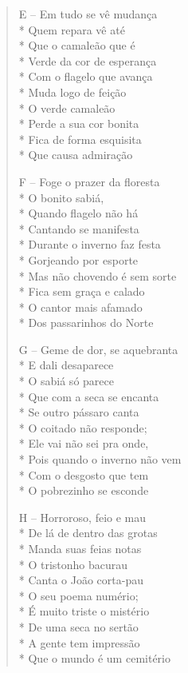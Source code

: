 \begin{verse}
E -- Em tudo se vê mudança\\*
Quem repara vê até\\*
Que o camaleão que é\\*
Verde da cor de esperança\\*
Com o flagelo que avança\\*
Muda logo de feição\\*
O verde camaleão\\*
Perde a sua cor bonita\\*
Fica de forma esquisita\\*
Que causa admiração

F -- Foge o prazer da floresta\\*
O bonito sabiá,\\*
Quando flagelo não há\\*
Cantando se manifesta\\*
Durante o inverno faz festa\\*
Gorjeando por esporte\\*
Mas não chovendo é sem sorte\\*
Fica sem graça e calado\\*
O cantor mais afamado\\*
Dos passarinhos do Norte

G -- Geme de dor, se aquebranta\\*
E dali desaparece\\*
O sabiá só parece\\*
Que com a seca se encanta\\*
Se outro pássaro canta\\*
O coitado não responde;\\*
Ele vai não sei pra onde,\\*
Pois quando o inverno não vem\\*
Com o desgosto que tem\\*
O pobrezinho se esconde

H -- Horroroso, feio e mau\\*
De lá de dentro das grotas\\*
Manda suas feias notas\\*
O tristonho bacurau\\*
Canta o João corta-pau\\*
O seu poema numério;\\*
É muito triste o mistério\\*
De uma seca no sertão\\*
A gente tem impressão\\*
Que o mundo é um cemitério


\end{verse}
